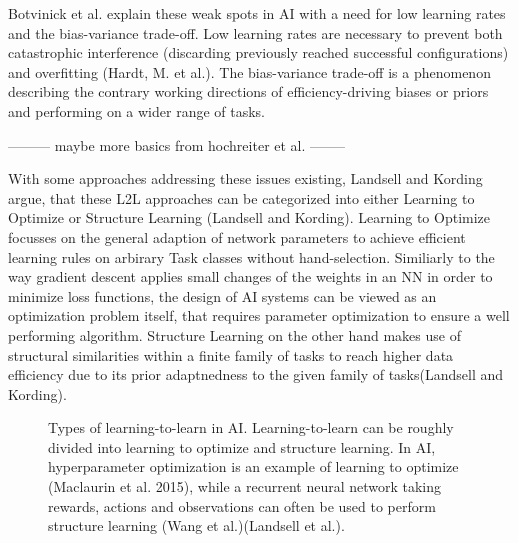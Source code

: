 \documentclass[letterpaper, 10 pt, conference]{ieeeconf}  %
\begin{document}
Botvinick et al. explain these weak spots in AI with a need for low learning rates and the bias-variance trade-off.
Low learning rates are necessary to prevent both catastrophic interference (discarding previously reached successful
configurations) and overfitting (Hardt, M. et al.). The bias-variance trade-off is a phenomenon describing the contrary 
working directions of efficiency-driving biases or priors and performing on a wider range of tasks. \newline

--------- maybe more basics from hochreiter et al. -------- \newline

With some approaches addressing these issues existing, Landsell and Kording argue, that these L2L approaches can be categorized into 
either Learning to Optimize or Structure Learning (Landsell and Kording). Learning to Optimize focusses on the general 
adaption of network parameters to achieve efficient learning rules on arbirary Task classes without hand-selection. Similiarly to the way
gradient descent applies small changes of the weights in an NN in order to minimize loss functions, the design of AI systems can be viewed as
an optimization problem itself, that requires parameter optimization to ensure a well performing algorithm. Structure Learning 
on the other hand makes use of structural similarities within a finite family of tasks to reach higher data
efficiency due to its prior adaptnedness to the given family of tasks(Landsell and Kording). \newline

\begin{figure}[thpb]
        \centering
  \caption{Types of learning-to-learn in AI. Learning-to-learn can be roughly divided into learning to optimize and structure learning.
  In AI, hyperparameter optimization is
  an example of learning to optimize (Maclaurin et al. 2015), while a recurrent neural network taking rewards, actions and observations
   can often be used to perform structure learning (Wang et al.)(Landsell et al.).}
        \label{figurelabel}
     \end{figure}
\end{document}
